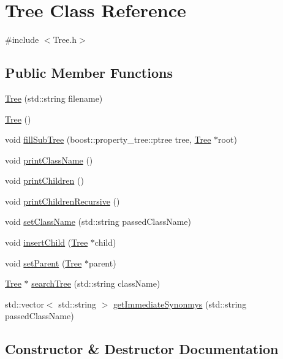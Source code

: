\hypertarget{class_tree}{}\section{Tree Class Reference}
\label{class_tree}


{\ttfamily \#include $<$Tree.\+h$>$}

\subsection*{Public Member Functions}
\begin{DoxyCompactItemize}
\item 
\hyperlink{class_tree_a9c617e144485ea46e7acd4ada998b469}{Tree} (std\+::string filename)
\item 
\hyperlink{class_tree_ad376a7c639d857312f5de2ef47482f68}{Tree} ()
\item 
void \hyperlink{class_tree_ae4c4da2bdb7f83b3d9394c6bdf4bff3b}{fill\+Sub\+Tree} (boost\+::property\+\_\+tree\+::ptree tree, \hyperlink{class_tree}{Tree} $\ast$root)
\item 
void \hyperlink{class_tree_a745082a21d2f7ce4952a6d4d8def516e}{print\+Class\+Name} ()
\item 
void \hyperlink{class_tree_a25c7c9886c5a882b69f775fc8a406732}{print\+Children} ()
\item 
void \hyperlink{class_tree_af1f79de9a19b36ffe830fce16db57174}{print\+Children\+Recursive} ()
\item 
void \hyperlink{class_tree_ac718ef932f2a48d178a4a5ee372fd847}{set\+Class\+Name} (std\+::string passed\+Class\+Name)
\item 
void \hyperlink{class_tree_ab6fb42578015f2c2d397c68609495e53}{insert\+Child} (\hyperlink{class_tree}{Tree} $\ast$child)
\item 
void \hyperlink{class_tree_aa299141dce83b8cae4679bf203fc8241}{set\+Parent} (\hyperlink{class_tree}{Tree} $\ast$parent)
\item 
\hyperlink{class_tree}{Tree} $\ast$ \hyperlink{class_tree_ac010956e6b34ee7137ccaf79b5f529a7}{search\+Tree} (std\+::string class\+Name)
\item 
std\+::vector$<$ std\+::string $>$ \hyperlink{class_tree_ab88f67717ecef951fac69e530ded3e5d}{get\+Immediate\+Synonmys} (std\+::string passed\+Class\+Name)
\end{DoxyCompactItemize}


\subsection{Constructor \& Destructor Documentation}
\mbox{\label{class_tree_a9c617e144485ea46e7acd4ada998b469}} 
